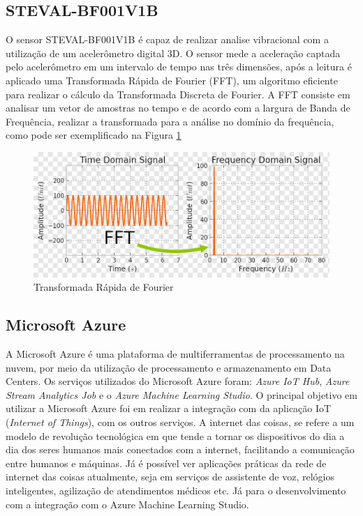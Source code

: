 \documentclass[
	article,			%
	12pt,				%
	oneside,			%
	a4paper,			%
	section=TITLE,		%
	subsection=TITLE,	%
	english,			%
	brazil,				%
	sumario=tradicional
	]{abntex2}
\begin{document}
\subsection*{STEVAL-BF001V1B}
O sensor STEVAL-BF001V1B é capaz de realizar analise vibracional com a utilização de um acelerômetro digital 3D. O sensor mede a aceleração captada pelo acelerômetro em um intervalo de tempo nas três dimensões, após a leitura é aplicado uma Transformada Rápida de Fourier (FFT), um algoritmo eficiente para realizar o cálculo da Transformada Discreta de Fourier. A FFT consiste em analisar um vetor de amostras no tempo e de acordo com a largura de Banda de Frequência, realizar a transformada para a análise no domínio da frequência, como pode ser exemplificado na Figura \ref{fig:fft}


\begin{figure}[H]
    \centering
    \includegraphics[scale=0.5]{fft.png}
    \caption{Transformada Rápida de Fourier}
    \label{fig:fft}
\end{figure}


\subsection*{Microsoft Azure}
A Microsoft Azure é uma plataforma de multiferramentas de processamento na nuvem, por meio da utilização de processamento e armazenamento em Data Centers. Os serviços utilizados do Microsoft Azure foram: \textit{Azure IoT Hub}, \textit{Azure Stream Analytics Job} e o \textit{Azure Machine Learning Studio}. O principal objetivo em utilizar a Microsoft Azure foi em realizar a integração com da aplicação IoT (\textit{Internet of Things}), com os outros serviços. A internet das coisas, se refere a um modelo de revolução tecnológica em que tende a tornar os dispositivos do dia a dia dos seres humanos mais conectados com a internet, facilitando a comunicação entre humanos e máquinas. Já é possível ver aplicações práticas da rede de internet das coisas atualmente, seja em serviços de assistente de voz, relógios inteligentes, agilização de atendimentos médicos etc. Já para o desenvolvimento com a integração com o Azure Machine Learning Studio.
\end{document}
